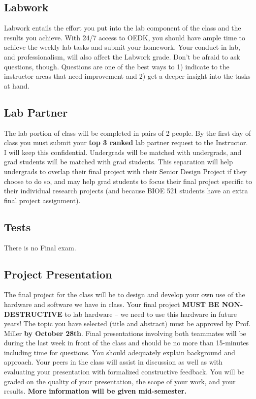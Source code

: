 \documentclass[10pt]{article}
\begin{document}
\subsection*{Labwork}
Labwork entails the effort you put into the lab component of the class and the results you achieve. With 24/7 access to OEDK, you should have ample time to achieve the weekly lab tasks and submit your homework. Your conduct in lab, and professionalism, will also affect the Labwork grade. Don't be afraid to ask questions, though. Questions are one of the best ways to 1) indicate to the instructor areas that need improvement and 2) get a deeper insight into the tasks at hand.

\subsection*{Lab Partner}
The lab portion of class will be completed in pairs of 2 people. By the first day of class you must submit your \textbf{top 3 ranked} lab partner request to the Instructor. I will keep this confidential. Undergrads will be matched with undergrads, and grad students will be matched with grad students. This separation will help undergrads to overlap their final project with their Senior Design Project if they choose to do so, and may help grad students to focus their final project specific to their individual research projects (and because BIOE 521 students have an extra final project assignment).

\subsection*{Tests}
There is no Final exam.

\subsection*{Project Presentation}
The final project for the class will be to design and develop your own use of the hardware and software we have in class. Your final project \textbf{MUST BE NON-DESTRUCTIVE} to lab hardware -- we need to use this hardware in future years! The topic you have selected (title and abstract) must be approved by Prof. Miller \textbf{by October 28th}. Final presentations involving both teammates will be during the last week in front of the class and should be no more than 15-minutes including time for questions. You should adequately explain background and approach. Your peers in the class will assist in discussion as well as with evaluating your presentation with formalized constructive feedback. You will be graded on the quality of your presentation, the scope of your work, and your results. \textbf{More information will be given mid-semester.} 
\end{document}
